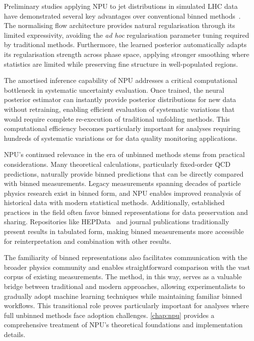     Preliminary studies applying NPU to jet distributions in simulated LHC data have demonstrated several key advantages over conventional binned methods~\cite{acosta2024npu}.
    The normalising flow architecture provides natural regularisation through its limited expressivity, avoiding the \textit{ad hoc} regularisation parameter tuning required by traditional methods.
    Furthermore, the learned posterior automatically adapts its regularisation strength across phase space, applying stronger smoothing where statistics are limited while preserving fine structure in well-populated regions.
    
    The amortised inference capability of NPU addresses a critical computational bottleneck in systematic uncertainty evaluation.
    Once trained, the neural posterior estimator can instantly provide posterior distributions for new data without retraining, enabling efficient evaluation of systematic variations that would require complete re-execution of traditional unfolding methods.
    This computational efficiency becomes particularly important for analyses requiring hundreds of systematic variations or for data quality monitoring applications.
    
    NPU's continued relevance in the era of unbinned methods stems from practical considerations.
    Many theoretical calculations, particularly fixed-order QCD predictions, naturally provide binned predictions that can be directly compared with binned measurements.
    Legacy measurements spanning decades of particle physics research exist in binned form, and NPU enables improved reanalysis of historical data with modern statistical methods.
    Additionally, established practices in the field often favor binned representations for data preservation and sharing.
    Repositories like HEPData~\cite{Maguire:2017ypu} and journal publications traditionally present results in tabulated form, making binned measurements more accessible for reinterpretation and combination with other results.
    
The familiarity of binned representations also facilitates communication with the broader physics community and enables straightforward comparison with the vast corpus of existing measurements.
    The method, in this way, serves as a valuable bridge between traditional and modern approaches, allowing experimentalists to gradually adopt machine learning techniques while maintaining familiar binned workflows.
    This transitional role proves particularly important for analyses where full unbinned methods face adoption challenges.
    \cref{chap:npu} provides a comprehensive treatment of NPU's theoretical foundations and implementation details.
    

